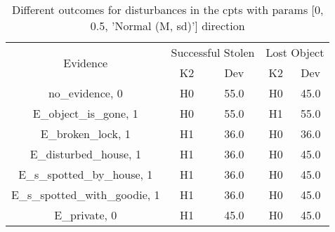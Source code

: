 \begin{table}\begin{tabular}{c|cc|cc}\toprule\multirow{2}{*}{Evidence} & \multicolumn{2}{c}{Successful Stolen} & \multicolumn{2}{c}{Lost Object} \\& {K2} & {Dev} & {K2} & {Dev} \\\midrule
no\_evidence, 0 & \cellcolor{Bittersweet}H0&\cellcolor{Bittersweet}55.0&\cellcolor{Bittersweet}H0&\cellcolor{Bittersweet}45.0\\E\_object\_is\_gone, 1 & \cellcolor{Bittersweet}H0&\cellcolor{Bittersweet}55.0&\cellcolor{Bittersweet}H1&\cellcolor{Bittersweet}55.0\\E\_broken\_lock, 1 & \cellcolor{Bittersweet}H1&\cellcolor{Bittersweet}36.0&\cellcolor{Bittersweet}H0&\cellcolor{Bittersweet}36.0\\E\_disturbed\_house, 1 & \cellcolor{Bittersweet}H1&\cellcolor{Bittersweet}36.0&\cellcolor{Bittersweet}H0&\cellcolor{Bittersweet}45.0\\E\_s\_spotted\_by\_house, 1 & \cellcolor{Bittersweet}H1&\cellcolor{Bittersweet}36.0&\cellcolor{Bittersweet}H0&\cellcolor{Bittersweet}45.0\\E\_s\_spotted\_with\_goodie, 1 & \cellcolor{Bittersweet}H1&\cellcolor{Bittersweet}36.0&\cellcolor{Bittersweet}H0&\cellcolor{Bittersweet}45.0\\E\_private, 0 & \cellcolor{Bittersweet}H1&\cellcolor{Bittersweet}45.0&\cellcolor{Bittersweet}H0&\cellcolor{Bittersweet}45.0\\\bottomrule\end{tabular}\caption{Different outcomes for disturbances in the cpts with params [0, 0.5, 'Normal (M, sd)'] direction}\end{table}